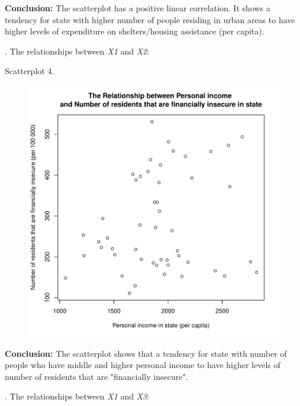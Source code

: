 \documentclass[12pt,letterpaper]{article}
\begin{document}
\noindent \textbf{Conclusion: } The scatterplot has a positive linear correlation. It shows a tendency for state with higher number of people residing in urban areas to have higher levels of expenditure on shelters/housing assistance (per capita).
\vspace{.5cm}

\newpage
{}. The relationships between \emph{X1} and \emph{X2}:
 
 
\noindent Scatterplot 4. 
\begin{figure}[h!]\centering
	\caption{\footnotesize }
	\label{fig:plot_1}
	\includegraphics[width=.75\textwidth]{plot1_4.pdf}
\end{figure}

\noindent \textbf{Conclusion:} The scatterplot shows that a tendency for state with  number of people who have middle and higher personal income to have higher levels of number of residents that are "financially insecure".
\vspace{.5cm}

\newpage
{}. The relationships between \emph{X1} and \emph{X3}:
 
 
\end{document}
